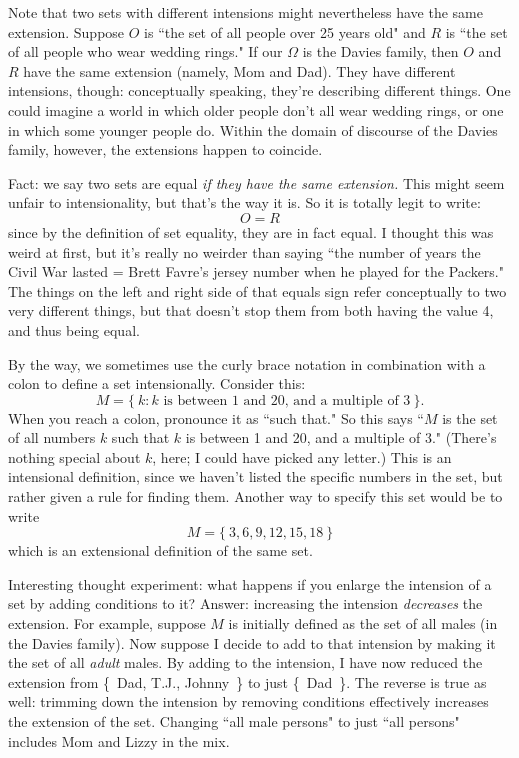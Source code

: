 Note that two sets with different intensions might nevertheless have
the same extension. Suppose $O$ is ``the set of all people over 25 years
old" and $R$ is ``the set of all people who wear wedding rings." If our
$\Omega$ is the Davies family, then $O$ and $R$ have the same extension
(namely, Mom and Dad). They have different intensions, though:
conceptually speaking, they're describing different things. One could
imagine a world in which older people don't all wear wedding rings, or one
in which some younger people do. Within the domain of discourse of the
Davies family, however, the extensions happen to coincide.

Fact: we say two sets are equal \textit{if they have the same extension.}
 This might seem unfair to intensionality, but
that's the way it is. So it is totally legit to write:
\[
O = R
\]
since by the definition of set equality, they are in fact equal. I thought
this was weird at first, but it's really no weirder than saying ``the
number of years the Civil War lasted = Brett Favre's jersey number when he
played for the Packers." The things on the left and right side of that
equals sign refer conceptually to two very different things, but that
doesn't stop them from both having the value 4, and thus being equal.

By the way, we sometimes use the curly brace notation in combination with a
colon to define a set intensionally. Consider this:
\[
M = \{~k : \text{$k$ is between 1 and 20, and a multiple of 3}~\}.
\]
When you reach a colon, pronounce it as ``such that." So this says ``$M$ is
the set of all numbers $k$ such that $k$ is between 1 and 20, and a
multiple of 3." (There's nothing special about $k$, here; I could have
picked any letter.) This is an intensional definition, since we haven't listed
the specific numbers in the set, but rather given a rule for finding them.
Another way to specify this set would be to write
\[
M = \{~3,6,9,12,15,18~\}
\]
which is an extensional definition of the same set.

Interesting thought experiment: what happens if you enlarge the intension
of a set by adding conditions to it?  Answer: increasing the intension
\textit{decreases} the extension. For example, suppose $M$ is initially
defined as the set of all males (in the Davies family). Now suppose I
decide to add to that intension by making it the set of all \textit{adult}
males. By adding to the intension, I have now reduced the extension from 
\{~Dad, T.J., Johnny~\} to just \{~Dad~\}.  The reverse is true as well:
trimming down the intension by removing conditions effectively increases
the extension of the set. Changing ``all male persons" to just ``all
persons" includes Mom and Lizzy in the mix.


